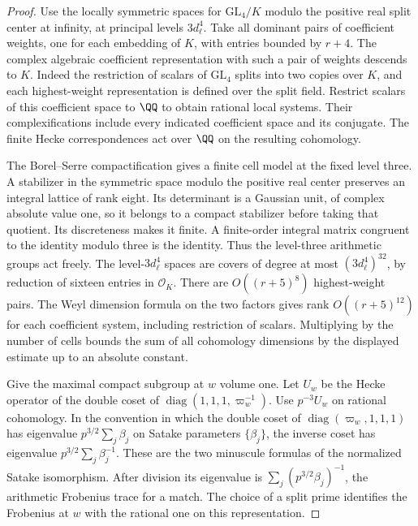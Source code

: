 \documentclass[a4paper,11pt]{article}
\theoremstyle{definition}
\theoremstyle{remark}
\numberwithin{equation}{section}
\begin{document}
\begin{proof}
Use the locally symmetric spaces for \(\mathrm{GL}_4/K\)
modulo the positive real split center at infinity, at principal
levels \(3d_\ell^4\). Take all dominant pairs of coefficient
weights, one for each embedding of \(K\), with entries bounded
by \(r+4\). The complex algebraic coefficient representation
with such a pair of weights descends to \(K\). Indeed the
restriction of scalars of \(\mathrm{GL}_4\) splits into two
copies over \(K\), and each highest-weight representation is
defined over the split field. Restrict scalars of this
coefficient space to \(\QQ\) to obtain rational local systems.
Their complexifications include every indicated coefficient
space and its conjugate. The finite Hecke correspondences act
over \(\QQ\) on the resulting cohomology.

The Borel--Serre compactification gives a finite cell model
at the fixed level three. A stabilizer in the symmetric space
modulo the positive real center preserves an integral lattice
of rank eight. Its determinant is a Gaussian unit, of complex
absolute value one, so it belongs to a compact stabilizer
before taking that quotient. Its discreteness makes it finite.
A finite-order integral matrix congruent to the identity modulo
three is the identity. Thus the level-three arithmetic groups
act freely. The level-\(3d_\ell^4\) spaces are covers of degree
at most \((3d_\ell^4)^{32}\), by reduction of sixteen entries
in \(\mathcal O_K\). There are \(O((r+5)^8)\) highest-weight
pairs. The Weyl dimension formula on the two factors gives
rank \(O((r+5)^{12})\) for each coefficient system, including
restriction of scalars. Multiplying by the number of cells
bounds the sum of all cohomology dimensions by the displayed
estimate up to an absolute constant.~\cite{XII-IX-V-bs}

Give the maximal compact subgroup at \(w\) volume one. Let
\(U_w\) be the Hecke operator of the double coset of
\(\operatorname{diag}(1,1,1,\varpi_w^{-1})\). Use
\(p^{-3}U_w\) on rational cohomology.
In the convention in which the double coset of
\(\operatorname{diag}(\varpi_w,1,1,1)\) has eigenvalue
\(p^{3/2}\sum_j\beta_j\) on Satake parameters \(\{\beta_j\}\),
the inverse coset has eigenvalue \(p^{3/2}\sum_j\beta_j^{-1}\).
These are the two minuscule formulas of the normalized Satake
isomorphism. After division its eigenvalue is
\(\sum_j(p^{3/2}\beta_j)^{-1}\), the arithmetic Frobenius
trace for a match. The choice of a split prime identifies the
Frobenius at \(w\) with the rational one on this representation.


\end{proof}
\end{document}
